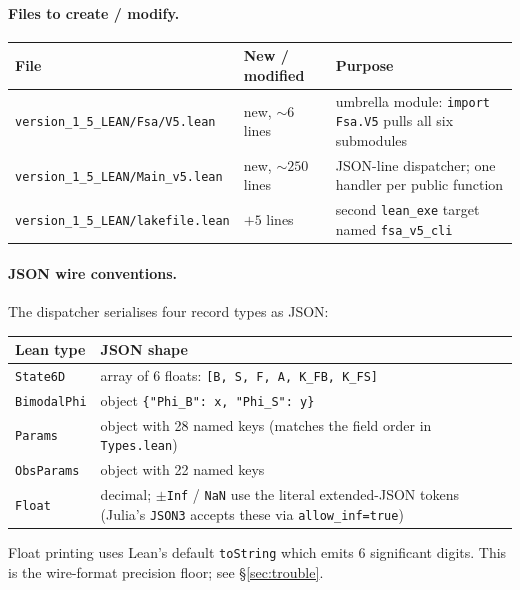 \documentclass[11pt,a4paper]{article}
\begin{document}
\paragraph{Files to create / modify.}

\begin{center}\footnotesize
\begin{tabular}{lll}
\toprule
File & New / modified & Purpose \\
\midrule
\texttt{version\_1\_5\_LEAN/Fsa/V5.lean}     & new, $\sim 6$ lines     & umbrella module: \texttt{import Fsa.V5} pulls all six submodules \\
\texttt{version\_1\_5\_LEAN/Main\_v5.lean}    & new, $\sim 250$ lines  & JSON-line dispatcher; one handler per public function \\
\texttt{version\_1\_5\_LEAN/lakefile.lean}    & $+5$ lines              & second \texttt{lean\_exe} target named \texttt{fsa\_v5\_cli} \\
\bottomrule
\end{tabular}
\end{center}

\paragraph{JSON wire conventions.} The dispatcher serialises four
record types as JSON:

\begin{center}\footnotesize
\begin{tabular}{lp{82mm}}
\toprule
Lean type & JSON shape \\
\midrule
\texttt{State6D}      & array of 6 floats: \texttt{[B, S, F, A, K\_FB, K\_FS]} \\
\texttt{BimodalPhi}   & object \texttt{\{"Phi\_B": x, "Phi\_S": y\}} \\
\texttt{Params}       & object with 28 named keys (matches the field order in \texttt{Types.lean}) \\
\texttt{ObsParams}    & object with 22 named keys \\
\texttt{Float}        & decimal; \texttt{$\pm$Inf} / \texttt{NaN} use the literal extended-JSON tokens (Julia's \texttt{JSON3} accepts these via \texttt{allow\_inf=true}) \\
\bottomrule
\end{tabular}
\end{center}

Float printing uses Lean's default \texttt{toString} which emits 6
significant digits. This is the wire-format precision floor; see
\S\ref{sec:trouble}.
\end{document}
